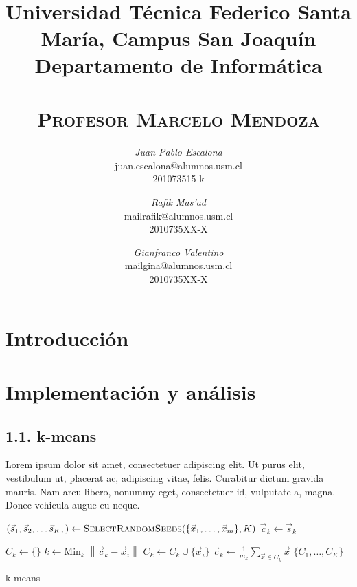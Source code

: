 \documentclass{article}
\title{
  \Large\textmd{\textbf{\tareaRamo\\ \tareaTitulo}}\\
  \vspace{0.1in}
  \normalsize
  Universidad Técnica Federico Santa María, Campus San Joaquín\\
  Departamento de Informática\\
  \vspace{0.1in}
  \small{\textsc{\tareaFecha}}\\
  \vspace{0.1in}
  \large{\textsc{Profesor Marcelo Mendoza}}
}
\author{
    \textit{Juan Pablo Escalona} \\
    \small{juan.escalona@alumnos.usm.cl} \\
    \small{201073515-k}
    \and
    \textit{Rafik Mas'ad} \\
    \small{mailrafik@alumnos.usm.cl} \\
    \small{2010735XX-X}
    \and
    \textit{Gianfranco Valentino}\\
    \small{mailgina@alumnos.usm.cl}\\
    \small{2010735XX-X}
}
\date{}
\begin{document}
\maketitle


\section*{Introducción}

\lipsum[3]

\section*{Implementación y análisis}

\subsection*{1.1. \; k-means}
Lorem ipsum dolor sit amet, consectetuer adipiscing elit. Ut purus elit, vestibulum ut, placerat ac, adipiscing vitae, felis. Curabitur dictum gravida mauris. Nam arcu libero, nonummy eget, consectetuer id, vulputate a, magna. Donec vehicula augue eu neque.

\begin{algorithm}[H]
  \begin{algorithmic}[1]
    \State $(\vec{s}_1,\vec{s}_2,\dots\vec{s}_K,) \leftarrow \textsc{SelectRandomSeeds}(\{\vec{x}_1,\dots,\vec{x}_m\}, K)$
        \State $\vec{c}_k \leftarrow \vec{s}_k$
    \EndFor

        \State $C_k \leftarrow \{\}$
      \EndFor
        \State $ k \leftarrow \text{Min}_k \; \left\|\vec{c}_k - \vec{x}_i\right\| $ 
        \State $ C_k \leftarrow C_k \cup \{\vec{x}_i\}$ 
      \EndFor
        \State $\vec{c}_k \leftarrow \frac{1}{m_k}\sum_{\vec{x}\in C_k}{\vec{x}}$ 
      \EndFor
    \EndWhile
    \State \Return $\{C_1, \dots, C_K\}$
    \EndProcedure
  \end{algorithmic}
  \caption{k-means}
  \label{kMeans}
\end{algorithm}
\end{document}
